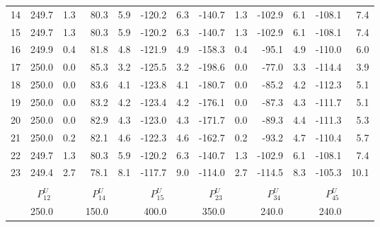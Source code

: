 \documentclass[12pt]{article}
\begin{document}
\begin{table}[h]
\begin{minipage}{\textwidth}
\begin{tabular}{crrrrrrrrrrrr}
14	&	249.7	&	1.3	&	80.3	&	5.9	&	-120.2	&	6.3	&	-140.7	&	1.3	&	-102.9	&	6.1	&	-108.1	&	7.4	\\
15	&	249.7	&	1.3	&	80.3	&	5.9	&	-120.2	&	6.3	&	-140.7	&	1.3	&	-102.9	&	6.1	&	-108.1	&	7.4	\\
16	&	249.9	&	0.4	&	81.8	&	4.8	&	-121.9	&	4.9	&	-158.3	&	0.4	&	-95.1	&	4.9	&	-110.0	&	6.0	\\
17	&	250.0	&	0.0	&	85.3	&	3.2	&	-125.5	&	3.2	&	-198.6	&	0.0	&	-77.0	&	3.3	&	-114.4	&	3.9	\\
18	&	250.0	&	0.0	&	83.6	&	4.1	&	-123.8	&	4.1	&	-180.7	&	0.0	&	-85.2	&	4.2	&	-112.3	&	5.1	\\
19	&	250.0	&	0.0	&	83.2	&	4.2	&	-123.4	&	4.2	&	-176.1	&	0.0	&	-87.3	&	4.3	&	-111.7	&	5.1	\\
20	&	250.0	&	0.0	&	82.9	&	4.3	&	-123.0	&	4.3	&	-171.7	&	0.0	&	-89.3	&	4.4	&	-111.3	&	5.3	\\
21	&	250.0	&	0.2	&	82.1	&	4.6	&	-122.3	&	4.6	&	-162.7	&	0.2	&	-93.2	&	4.7	&	-110.4	&	5.7	\\
22	&	249.7	&	1.3	&	80.3	&	5.9	&	-120.2	&	6.3	&	-140.7	&	1.3	&	-102.9	&	6.1	&	-108.1	&	7.4	\\
23	&	249.4	&	2.7	&	78.1	&	8.1	&	-117.7	&	9.0	&	-114.0	&	2.7	&	-114.5	&	8.3	&	-105.3	&	10.1	\\

\hline \\[0.05ex]
& $P_{12}^U~$ & & $P_{14}^U~$ & & $P_{15}^U~$ & & $P_{23}^U~$ & & $P_{34}^U~$ & & $P_{45}^U~$ \\
&	250.0	& &	150.0	& &	400.0	& &	350.0	& &	240.0	& &	240.0	\\

\hline
\end{tabular}
\end{minipage}
\end{table}
\end{document}
